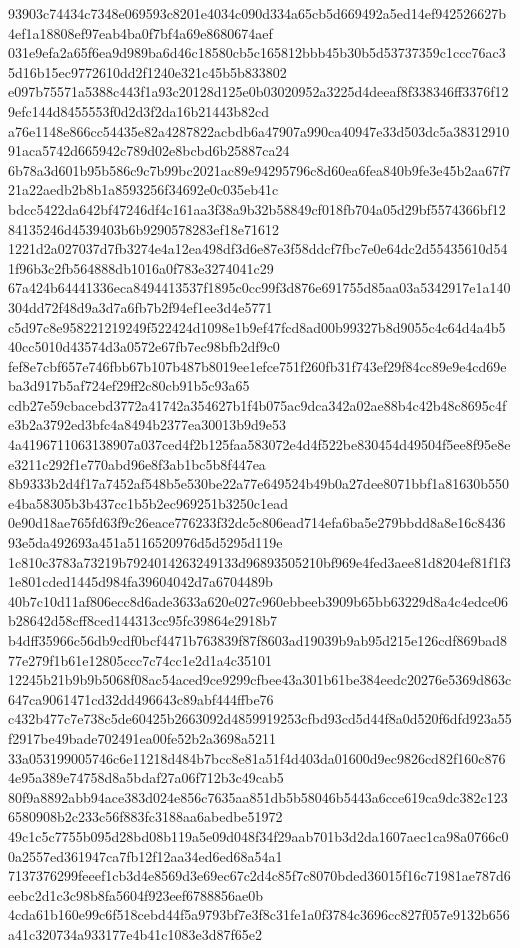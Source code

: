 \documentclass[11pt,a4paper]{article}
\begin{document}
{93903c74434c7348e069593c8201e4034c090d334a65cb5d669492a5ed14ef942526627b4ef1a18808ef97eab4ba0f7bf4a69e8680674aef
031e9efa2a65f6ea9d989ba6d46c18580cb5c165812bbb45b30b5d53737359c1ccc76ac35d16b15ec9772610dd2f1240e321c45b5b833802
e097b75571a5388c443f1a93c20128d125e0b03020952a3225d4deeaf8f338346ff3376f129efc144d8455553f0d2d3f2da16b21443b82cd
a76e1148e866cc54435e82a4287822acbdb6a47907a990ca40947e33d503dc5a3831291091aca5742d665942c789d02e8bcbd6b25887ca24
6b78a3d601b95b586c9c7b99bc2021ac89e94295796c8d60ea6fea840b9fe3e45b2aa67f721a22aedb2b8b1a8593256f34692e0c035eb41c
bdcc5422da642bf47246df4c161aa3f38a9b32b58849cf018fb704a05d29bf5574366bf1284135246d4539403b6b9290578283ef18e71612
1221d2a027037d7fb3274e4a12ea498df3d6e87e3f58ddcf7fbc7e0e64dc2d55435610d541f96b3c2fb564888db1016a0f783e3274041c29
67a424b64441336eca8494413537f1895c0cc99f3d876e691755d85aa03a5342917e1a140304dd72f48d9a3d7a6fb7b2f94ef1ee3d4e5771
c5d97c8e958221219249f522424d1098e1b9ef47fcd8ad00b99327b8d9055c4c64d4a4b540cc5010d43574d3a0572e67fb7ec98bfb2df9c0
fef8e7cbf657e746fbb67b107b487b8019ee1efce751f260fb31f743ef29f84cc89e9e4cd69eba3d917b5af724ef29ff2c80cb91b5c93a65
cdb27e59cbacebd3772a41742a354627b1f4b075ac9dca342a02ae88b4c42b48c8695c4fe3b2a3792ed3bfc4a8494b2377ea30013b9d9e53
4a4196711063138907a037ced4f2b125faa583072e4d4f522be830454d49504f5ee8f95e8ee3211c292f1e770abd96e8f3ab1bc5b8f447ea
8b9333b2d4f17a7452af548b5e530be22a77e649524b49b0a27dee8071bbf1a81630b550e4ba58305b3b437cc1b5b2ec969251b3250c1ead
0e90d18ae765fd63f9c26eace776233f32dc5c806ead714efa6ba5e279bbdd8a8e16c843693e5da492693a451a5116520976d5d5295d119e
1c810c3783a73219b7924014263249133d96893505210bf969e4fed3aee81d8204ef81f1f31e801cded1445d984fa39604042d7a6704489b
40b7c10d11af806ecc8d6ade3633a620e027c960ebbeeb3909b65bb63229d8a4c4edce06b28642d58cff8ced144313cc95fc39864e2918b7
b4dff35966c56db9cdf0bcf4471b763839f87f8603ad19039b9ab95d215e126cdf869bad877e279f1b61e12805ccc7c74cc1e2d1a4c35101
12245b21b9b9b5068f08ac54aced9ce9299cfbee43a301b61be384eedc20276e5369d863c647ca9061471cd32dd496643c89abf444ffbe76
c432b477c7e738c5de60425b2663092d4859919253cfbd93cd5d44f8a0d520f6dfd923a55f2917be49bade702491ea00fe52b2a3698a5211
33a053199005746c6e11218d484b7bcc8e81a51f4d403da01600d9ec9826cd82f160c8764e95a389e74758d8a5bdaf27a06f712b3c49cab5
80f9a8892abb94ace383d024e856c7635aa851db5b58046b5443a6cce619ca9dc382c1236580908b2c233c56f883fc3188aa6abedbe51972
49c1c5c7755b095d28bd08b119a5e09d048f34f29aab701b3d2da1607aec1ca98a0766c00a2557ed361947ca7fb12f12aa34ed6ed68a54a1
7137376299feeef1cb3d4e8569d3e69ec67c2d4c85f7c8070bded36015f16c71981ae787d6eebc2d1c3c98b8fa5604f923eef6788856ae0b
4cda61b160e99c6f518cebd44f5a9793bf7e3f8c31fe1a0f3784c3696cc827f057e9132b656a41c320734a933177e4b41c1083e3d87f65e2
}
\end{document}
